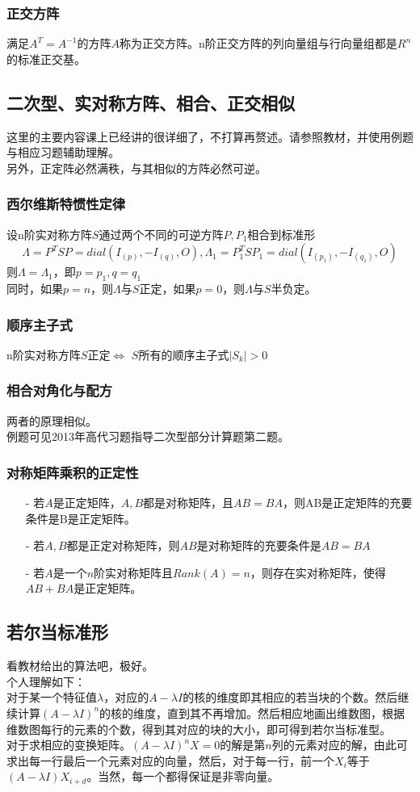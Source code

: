 \documentclass[UTF8]{ctexart}
\begin{document}
\subsubsection{正交方阵}
满足$A^{T}=A^{-1}$的方阵$A$称为正交方阵。n阶正交方阵的列向量组与行向量组都是$R^{n}$的标准正交基。
\subsection{二次型、实对称方阵、相合、正交相似}
这里的主要内容课上已经讲的很详细了，不打算再赘述。请参照教材，并使用例题与相应习题辅助理解。\\
\indent
另外，正定阵必然满秩，与其相似的方阵必然可逆。
\subsubsection{西尔维斯特惯性定律}
设n阶实对称方阵$S$通过两个不同的可逆方阵$P,P_{1}$相合到标准形
\[\Lambda=P^{T}SP=dial(I_{(p)},-I_{(q)},\mathit{O}),\Lambda_{1}=P_{1}^{T}SP_{1}=dial(I_{(p_1)},-I_{(q_1)},\mathit{O}) \]
则$\Lambda=\Lambda_{1}$，即$p=p_1,q=q_1$\\
\indent
同时，如果$p=n$，则$\Lambda$与$S$正定，如果$p=0$，则$\Lambda$与$S$半负定。
\subsubsection{顺序主子式}
n阶实对称方阵$S$正定$\Leftrightarrow$ $S$所有的顺序主子式$|S_k|>0$
\subsubsection{相合对角化与配方}
两者的原理相似。\\
\indent
例题可见2013年高代习题指导二次型部分计算题第二题。
\subsubsection{对称矩阵乘积的正定性}
\begin{itemize}
    \item [-]若$A$是正定矩阵，$A,B$都是对称矩阵，且$AB=BA$，则AB是正定矩阵的充要条件是B是正定矩阵。
    \item [-]若$A,B$都是正定对称矩阵，则$AB$是对称矩阵的充要条件是$AB=BA$
    \item [-]若$A$是一个$n$阶实对称矩阵且$Rank(A)=n$，则存在实对称矩阵，使得$AB+BA$是正定矩阵。
\end{itemize}
\subsection{若尔当标准形}
看教材给出的算法吧，极好。\\
\indent
个人理解如下：\\
\indent
对于某一个特征值$\lambda$，对应的$A-\lambda I$的核的维度即其相应的若当块的个数。然后继续计算$(A-\lambda I)^{n}$的核的维度，直到其不再增加。然后相应地画出维数图，根据维数图每行的元素的个数，得到其对应的块的大小，即可得到若尔当标准型。\\
\indent
对于求相应的变换矩阵。$(A-\lambda I)^{n}\mathit{X}=\mathit{0}$的解是第$n$列的元素对应的解，由此可求出每一行最后一个元素对应的向量，然后，对于每一行，前一个$\mathit{X_{i}}$等于$(A-\lambda I)\mathit{X_{i+d}}$。当然，每一个都得保证是非零向量。
\end{document}
